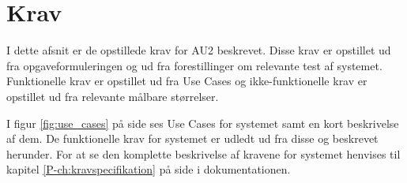 \chapter{Krav}\label{ch:Krav} %

I dette afsnit er de opstillede krav for AU2 beskrevet.
Disse krav er opstillet ud fra opgaveformuleringen og ud fra forestillinger om relevante test af systemet. 
Funktionelle krav er opstillet ud fra Use Cases og ikke-funktionelle krav er opstillet ud fra relevante målbare størrelser.

I figur \ref{fig:use_cases} på side \pageref{fig:use_cases} ses Use Cases for systemet samt en kort beskrivelse af dem. 
De funktionelle krav for systemet er udledt ud fra disse og beskrevet herunder. 
For at se den komplette beskrivelse af kravene for systemet henvises til kapitel \ref{P-ch:kravspecifikation}  på side \pageref{P-ch:kravspecifikation} i dokumentationen.

